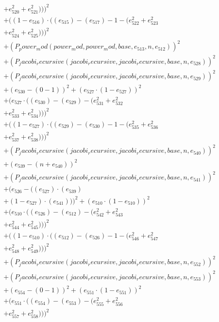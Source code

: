 \documentclass[10pt, a4paper]{article}
\begin{document}
\begin{small}
\begin{align*}
& + e_{520}^{2} + e_{521}^{2})))^{2} \\
& + ((1 - e_{516})  \cdot  ((e_{515}) - (e_{517}) - 1 - (e_{522}^{2} + e_{523}^{2} \\
& + e_{524}^{2} + e_{525}^{2})))^{2} \\
& + (P_power_mod(power_mod, power_mod, base, e_{513}, n, e_{512}))^{2} \\
& + (P_jacobi_recursive(jacobi_recursive, jacobi_recursive, base, n, e_{528}))^{2} \\
& + (P_jacobi_recursive(jacobi_recursive, jacobi_recursive, base, n, e_{529}))^{2} \\
& + (e_{530} - (0 - 1))^{2} + (e_{527}  \cdot  (1 - e_{527}))^{2} \\
& + (e_{527}  \cdot  ((e_{530}) - (e_{529}) - (e_{531}^{2} + e_{532}^{2} \\
& + e_{533}^{2} + e_{534}^{2})))^{2} \\
& + ((1 - e_{527})  \cdot  ((e_{529}) - (e_{530}) - 1 - (e_{535}^{2} + e_{536}^{2} \\
& + e_{537}^{2} + e_{538}^{2})))^{2} \\
& + (P_jacobi_recursive(jacobi_recursive, jacobi_recursive, base, n, e_{540}))^{2} \\
& + (e_{539} - (n + e_{540}))^{2} \\
& + (P_jacobi_recursive(jacobi_recursive, jacobi_recursive, base, n, e_{541}))^{2} \\
& + (e_{526} - ((e_{527})  \cdot  (e_{539}) \\
& + (1 - e_{527})  \cdot  (e_{541})))^{2} + (e_{510}  \cdot  (1 - e_{510}))^{2} \\
& + (e_{510}  \cdot  ((e_{526}) - (e_{512}) - (e_{542}^{2} + e_{543}^{2} \\
& + e_{544}^{2} + e_{545}^{2})))^{2} \\
& + ((1 - e_{510})  \cdot  ((e_{512}) - (e_{526}) - 1 - (e_{546}^{2} + e_{547}^{2} \\
& + e_{548}^{2} + e_{549}^{2})))^{2} \\
& + (P_jacobi_recursive(jacobi_recursive, jacobi_recursive, base, n, e_{552}))^{2} \\
& + (P_jacobi_recursive(jacobi_recursive, jacobi_recursive, base, n, e_{553}))^{2} \\
& + (e_{554} - (0 - 1))^{2} + (e_{551}  \cdot  (1 - e_{551}))^{2} \\
& + (e_{551}  \cdot  ((e_{554}) - (e_{553}) - (e_{555}^{2} + e_{556}^{2} \\
& + e_{557}^{2} + e_{558}^{2})))^{2} \\

\end{align*}
\end{small}
\end{document}

